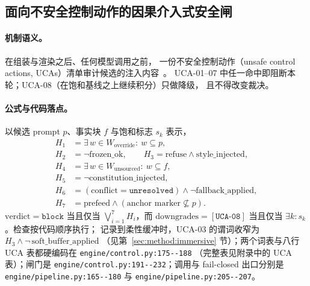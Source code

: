 \subsection{面向不安全控制动作的因果介入式安全闸}

\paragraph{机制语义。} 在组装与渲染之后、任何模型调用之前，
一份不安全控制动作（unsafe control actions, UCAs）清单审计候选的注入内容~\cite{leveson2018}。
UCA-01--07 中任一命中即阻断本轮；UCA-08（在饱和基线之上继续积分）只做降级，
且不得改变裁决。

\paragraph{公式与代码落点。} 以候选 prompt $p$、事实块 $f$ 与饱和标志 $s_k$ 表示，
{\small
\begin{equation}
\begin{aligned}
H_1 &= \exists\, w \in W_{\mathrm{override}}:\ w \subseteq p,\\
H_2 &= \neg \mathrm{frozen\_ok},\qquad
H_3 = \mathrm{refuse} \land \mathrm{style\_injected},\\
H_4 &= \exists\, w \in W_{\mathrm{unsourced}}:\ w \subseteq f,\\
H_5 &= \neg \mathrm{constitution\_injected},\\
H_6 &= (\mathrm{conflict} = \texttt{unresolved}) \land \neg \mathrm{fallback\_applied},\\
H_7 &= \mathrm{prefeed} \land (\text{anchor marker} \not\subseteq p).
\end{aligned}
\end{equation}
}
$\mathrm{verdict} = \texttt{block}$ 当且仅当 $\bigvee_{i=1}^{7} H_i$，而
$\mathrm{downgrades} = [\texttt{UCA-08}]$ 当且仅当 $\exists k: s_k$。检查按代码顺序执行；
记录到柔性缓冲时，UCA-03 的谓词收窄为 $H_3 \land \neg\,\mathrm{soft\_buffer\_applied}$
（见第~\ref{sec:method:immersive} 节）；两个词表与八行 UCA 表都硬编码在 \texttt{engine/\allowbreak{}control.\allowbreak{}py:\allowbreak{}175-\allowbreak{}-\allowbreak{}188}
（完整表见附录中的 UCA 表）；闸门是
\texttt{engine/\allowbreak{}control.\allowbreak{}py:\allowbreak{}191-\allowbreak{}-\allowbreak{}232}；调用与 fail-closed 出口分别是
\texttt{engine/\allowbreak{}pipeline.\allowbreak{}py:\allowbreak{}165-\allowbreak{}-\allowbreak{}180} 与 \texttt{engine/\allowbreak{}pipeline.\allowbreak{}py:\allowbreak{}205-\allowbreak{}-\allowbreak{}207}。

